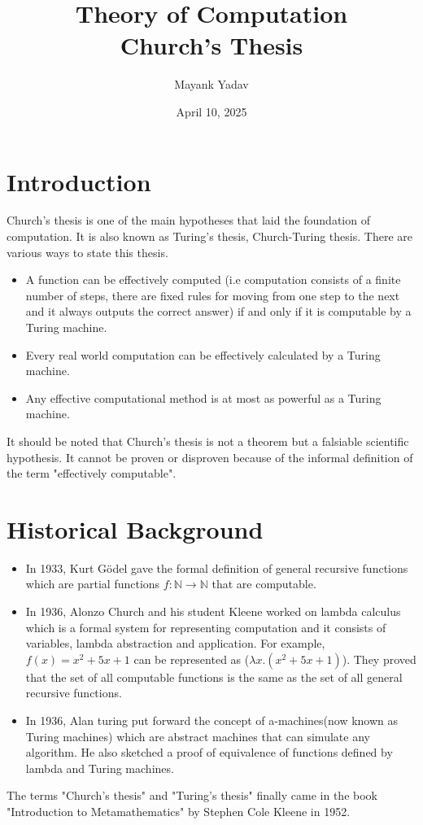 \documentclass{article}
\title{ \large Theory of Computation \\ \LARGE   Church's Thesis}
\author{Mayank Yadav}
\date{April 10, 2025}
\begin{document}
\maketitle


\section{Introduction}
Church's thesis is one of the main hypotheses that laid the foundation of computation. It is also known as Turing's thesis, Church-Turing thesis.
There are various ways to state this thesis.
\begin{itemize}
    \item A function can be effectively computed (i.e computation consists of a finite number of steps, there are fixed rules for moving from one step to the next and it always outputs the correct answer) if and only if it is computable by a Turing machine.

    \item Every real world computation can be effectively calculated by a Turing machine.

    \item Any effective computational method is at most as powerful as a Turing machine.

\end{itemize}
It should be noted that Church's thesis is not a theorem but a falsiable scientific hypothesis. It cannot be proven or disproven because of the informal definition of the term "effectively computable".

\section{Historical Background}

\begin{itemize}
  \item In 1933, Kurt Gödel gave the formal definition of general recursive functions which are partial functions $f: \mathbb{N} \to \mathbb{N}$ that are computable.

  \item In 1936, Alonzo Church and his student Kleene worked on lambda calculus which is a formal system for representing computation and it consists of variables, lambda abstraction and application. For example, $f(x)=x^2+5x+1$ can be represented as ($\lambda x.(x^2+5x+1)$). They proved that the set of all computable functions is the same as the set of all general recursive functions.

  \item In 1936, Alan turing put forward the concept of a-machines(now known as Turing machines) which are abstract machines that can simulate any algorithm. He also sketched a proof of equivalence of functions defined by lambda and Turing machines.
\end{itemize}
  The terms "Church's thesis" and "Turing's thesis" finally came in the book "Introduction to Metamathematics" by Stephen Cole Kleene in 1952. 
\end{document}
